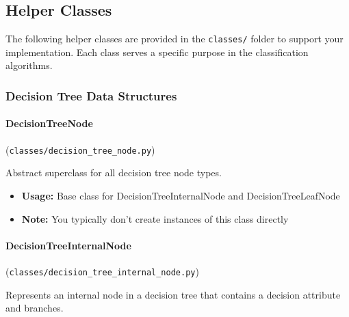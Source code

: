 \documentclass[
english,
smallborders
]{i6prcsht}
\begin{document}
\subsection*{Helper Classes}

The following helper classes are provided in the \texttt{classes/} folder to support your implementation. Each class serves a specific purpose in the classification algorithms.

\vspace*{0.5cm}

\subsubsection*{Decision Tree Data Structures}

\paragraph{DecisionTreeNode} (\texttt{classes/decision\_tree\_node.py})

Abstract superclass for all decision tree node types.

\begin{itemize}
	\item \textbf{Usage:} Base class for DecisionTreeInternalNode and DecisionTreeLeafNode
	\item \textbf{Note:} You typically don't create instances of this class directly
\end{itemize}

\vspace*{0.3cm}

\paragraph{DecisionTreeInternalNode} (\texttt{classes/decision\_tree\_internal\_node.py})

Represents an internal node in a decision tree that contains a decision attribute and branches.
\end{document}
